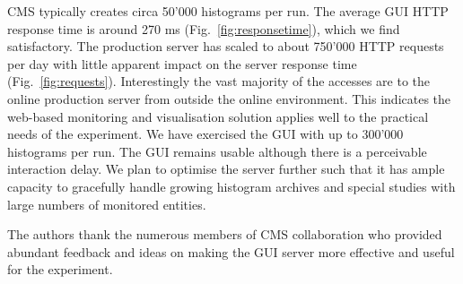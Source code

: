 \documentclass[a4paper]{jpconf}
\begin{document}
CMS typically creates circa 50'000 histograms per run.  The average
GUI HTTP response time is around 270 ms (Fig.~\ref{fig:responsetime}),
which we find satisfactory.  The production server has scaled to about
750'000 HTTP requests per day with little apparent impact on the
server response time (Fig.~\ref{fig:requests}).  Interestingly the
vast majority of the accesses are to the online production server from
outside the online environment.  This indicates the web-based
monitoring and visualisation solution applies well to the practical
needs of the experiment.  We have exercised the GUI with up to 300'000
histograms per run.  The GUI remains usable although there is a
perceivable interaction delay.  We plan to optimise the server further
such that it has ample capacity to gracefully handle growing histogram
archives and special studies with large numbers of monitored entities.


\ack

The authors thank the numerous members of CMS collaboration who
provided abundant feedback and ideas on making the GUI server more
effective and useful for the experiment.

\end{document}
